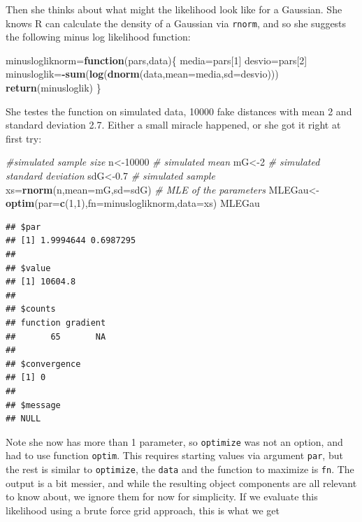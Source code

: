 \documentclass[
]{book}
\newenvironment{Shaded}{\begin{snugshade}}{\end{snugshade}}
\newcommand{\CommentTok}[1]{\textcolor[rgb]{0.56,0.35,0.01}{\textit{#1}}}
\newcommand{\ControlFlowTok}[1]{\textcolor[rgb]{0.13,0.29,0.53}{\textbf{#1}}}
\newcommand{\DataTypeTok}[1]{\textcolor[rgb]{0.13,0.29,0.53}{#1}}
\newcommand{\DecValTok}[1]{\textcolor[rgb]{0.00,0.00,0.81}{#1}}
\newcommand{\FloatTok}[1]{\textcolor[rgb]{0.00,0.00,0.81}{#1}}
\newcommand{\KeywordTok}[1]{\textcolor[rgb]{0.13,0.29,0.53}{\textbf{#1}}}
\newcommand{\NormalTok}[1]{#1}
\newcommand{\OperatorTok}[1]{\textcolor[rgb]{0.81,0.36,0.00}{\textbf{#1}}}
\begin{document}
Then she thinks about what might the likelihood look like for a Gaussian. She knows R can calculate the density of a Gaussian via \texttt{rnorm}, and so she suggests the following minus log likelihood function:

\begin{Shaded}
\begin{Highlighting}[]
\NormalTok{minuslogliknorm=}\ControlFlowTok{function}\NormalTok{(pars,data)\{}
\NormalTok{  media=pars[}\DecValTok{1}\NormalTok{]}
\NormalTok{  desvio=pars[}\DecValTok{2}\NormalTok{]}
\NormalTok{  minusloglik=}\OperatorTok{-}\KeywordTok{sum}\NormalTok{(}\KeywordTok{log}\NormalTok{(}\KeywordTok{dnorm}\NormalTok{(data,}\DataTypeTok{mean=}\NormalTok{media,}\DataTypeTok{sd=}\NormalTok{desvio)))}
  \KeywordTok{return}\NormalTok{(minusloglik)}
\NormalTok{\}}
\end{Highlighting}
\end{Shaded}

She testes the function on simulated data, 10000 fake distances with mean 2 and standard deviation 2.7. Either a small miracle happened, or she got it right at first try:

\begin{Shaded}
\begin{Highlighting}[]
\CommentTok{#simulated sample size}
\NormalTok{n<-}\DecValTok{10000}
\CommentTok{# simulated mean}
\NormalTok{mG<-}\DecValTok{2}
\CommentTok{# simulated standard deviation}
\NormalTok{sdG<-}\FloatTok{0.7}
\CommentTok{# simulated sample}
\NormalTok{xs=}\KeywordTok{rnorm}\NormalTok{(n,}\DataTypeTok{mean=}\NormalTok{mG,}\DataTypeTok{sd=}\NormalTok{sdG)}
\CommentTok{# MLE of the parameters}
\NormalTok{MLEGau<-}\KeywordTok{optim}\NormalTok{(}\DataTypeTok{par=}\KeywordTok{c}\NormalTok{(}\DecValTok{1}\NormalTok{,}\DecValTok{1}\NormalTok{),}\DataTypeTok{fn=}\NormalTok{minuslogliknorm,}\DataTypeTok{data=}\NormalTok{xs)}
\NormalTok{MLEGau}
\end{Highlighting}
\end{Shaded}

\begin{verbatim}
## $par
## [1] 1.9994644 0.6987295
## 
## $value
## [1] 10604.8
## 
## $counts
## function gradient 
##       65       NA 
## 
## $convergence
## [1] 0
## 
## $message
## NULL
\end{verbatim}

Note she now has more than 1 parameter, so \texttt{optimize} was not an option, and had to use function \texttt{optim}. This requires starting values via argument \texttt{par}, but the rest is similar to \texttt{optimize}, the \texttt{data} and the function to maximize is \texttt{fn}. The output is a bit messier, and while the resulting object components are all relevant to know about, we ignore them for now for simplicity. If we evaluate this likelihood using a brute force grid approach, this is what we get
\end{document}

